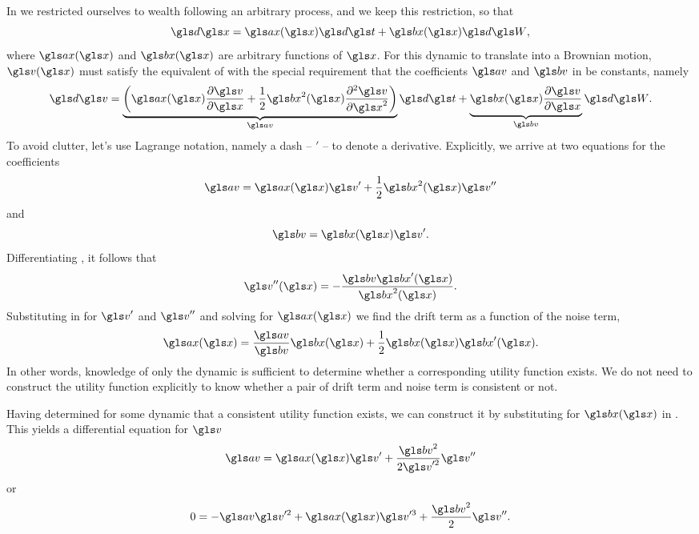 \begin{itemize}
In \secref{} we restricted ourselves to wealth following an arbitrary \Ito process, 
and we keep this restriction, so that
\begin{equation}
\gd\x=\ax(\x) \gd\t +\bx(\x) \gd\gW,
\elabel{dx_1}
\end{equation}
where $\ax(\x)$ and $\bx(\x)$ are arbitrary functions of $\x$. For 
this dynamic to translate into a Brownian motion, $\gv(\x)$ must 
satisfy the equivalent of  with the special
requirement that the coefficients $\av$ and $\bv$ in  be constants, namely
\begin{equation}
\gd\gv = \underbrace{\left(\ax(\x) \frac{\partial \gv}{\partial \x} + \frac{1}{2}\bx^2(\x)\frac{\partial^2 \gv}{\partial \x^2}\right)}_{\av}\gd\t + \underbrace{\bx(\x) \frac{\partial \gv}{\partial \x}}_{\bv} \gd\gW.
\elabel{du_2}
\end{equation}
To avoid clutter, let's use 
Lagrange notation, namely a dash  -- $'$ -- to denote a derivative. 
Explicitly, we arrive at two equations for the coefficients  
\begin{equation}
\av=\ax(\x) \gv' + \frac{1}{2} \bx^2(\x) \gv''
\elabel{A}
\end{equation}
and
\begin{equation}
\bv=\bx(\x) \gv'.
\elabel{b_u}
\end{equation}
Differentiating , it follows that 
\begin{equation}
\gv''(\x)=-\frac{\bv \bx'(\x)}{\bx^2(\x)}.
\end{equation}
Substituting in  for $\gv'$ and $\gv''$ and solving for $\ax(\x)$ we
find the drift term as a function of the noise term,
\begin{equation}
\ax(\x) =\frac{\av}{\bv}\bx(\x)+ \frac{1}{2}\bx(\x)\bx'(\x).
\elabel{consistency}
\end{equation}
In other words, knowledge of only the dynamic
is sufficient to determine whether a corresponding utility function exists.
We do not need to construct the utility function explicitly to know whether a pair 
of drift term and noise term is consistent or not. 

Having determined for some dynamic that a consistent utility function 
exists, we can construct it by substituting for $\bx(\x)$ in . 
This yields  a differential equation for $\gv$
\begin{equation}
\av=\ax(\x) \gv' + \frac{\bv^2}{2\gv'^2}  \gv''
\end{equation}
or
\begin{equation}
0=-\av \gv'^2+ \ax(\x) \gv'^3 + \frac{\bv^2}{2}  \gv''.
\end{equation}


\end{itemize}
